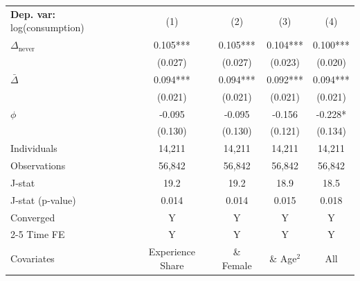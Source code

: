 \begin{tabular}{l cccc} \toprule  \textbf{Dep. var:}  log(consumption) 
                    &\multicolumn{1}{c}{(1)}   &\multicolumn{1}{c}{(2)}   &\multicolumn{1}{c}{(3)}   &\multicolumn{1}{c}{(4)}   \\

\addlinespace
$\Delta_{\text{never}}$&       0.105***&       0.105***&       0.104***&       0.100***\\
                    &     (0.027)   &     (0.027)   &     (0.023)   &     (0.020)   \\

\addlinespace
$\bar{\Delta}$      &       0.094***&       0.094***&       0.092***&       0.094***\\
                    &     (0.021)   &     (0.021)   &     (0.021)   &     (0.021)   \\

\addlinespace
$\phi$              &      -0.095   &      -0.095   &      -0.156   &      -0.228*  \\
                    &     (0.130)   &     (0.130)   &     (0.121)   &     (0.134)   \\
\addlinespace
Individuals         &      14,211   &      14,211   &      14,211   &      14,211   \\
Observations        &      56,842   &      56,842   &      56,842   &      56,842   \\
J-stat              &        19.2   &        19.2   &        18.9   &        18.5   \\
J-stat (p-value)    &       0.014   &       0.014   &       0.015   &       0.018   \\
Converged           &           Y   &           Y   &           Y   &           Y   \\
\cmidrule{2-5} Time FE & Y & Y & Y & Y \\ Covariates & Experience Share & \& Female & \& Age$^2$ & All \\ \bottomrule \end{tabular}
